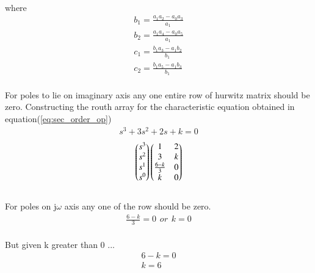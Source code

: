 \begin{enumerate}[label=\thesection.\arabic*.,ref=\thesection.\theenumi]
 \\
 where
 \begin{align}
 b_1 =\frac{ a_1a_2-a_0a_3}{a_1}  
 \\
 b_2 =\frac{ a_1a_4-a_0a_5}{a_1} 
 \\
 c_1=\frac{ b_1a_3-a_1b_2}{b_1} 
\\
 c_2=\frac{ b_1a_5-a_1b_3}{b_1}  
\end{align}
\\
For poles to lie on imaginary axis any one entire row of hurwitz matrix should be zero.
Constructing the routh array for the characteristic equation obtained in equation(\ref{eq:sec_order_op})
\begin{align}
 s^3+3s^2+2s+k = 0
\end{align}
%
\begin{align}
\begin{pmatrix}s^3\\s^2\\s^1 \\ s^0\end{pmatrix}
\begin{pmatrix}1 & 2 \\ 3 & k \\  \frac{6-k}{3} & 0\\ k & 0\end{pmatrix}
\end{align}
\\
For poles on j$\omega$ axis any one of the row should be zero.
\\
\begin{align}
\frac{6-k}{3} = 0 \hspace{5pt} or\hspace{5pt} k = 0
\end{align}
\\
But given k greater than 0 ...
\begin{align}
   6-k = 0\\
   k = 6
\end{align}
\end{enumerate}
